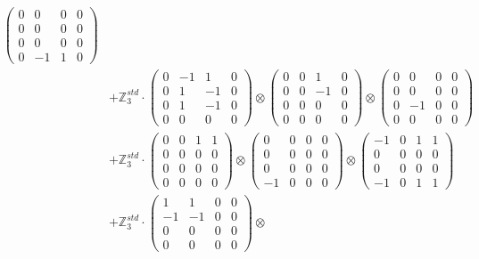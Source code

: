 \documentclass{article}
\begin{document}
{\begin{align}
            \begin{pmatrix} 0 & 0 & 0 & 0 \\ 0 & 0 & 0 & 0 \\ 0 & 0 & 0 & 0 \\ 0 & -1 & 1 & 0 \end{pmatrix} \\ 
        &+ \label{Rs16-Rc11-Solution-18-c25} \mathbb{Z}_3^{std} \cdot 
            \begin{pmatrix} 0 & -1 & 1 & 0 \\ 0 & 1 & -1 & 0 \\ 0 & 1 & -1 & 0 \\ 0 & 0 & 0 & 0 \end{pmatrix} \otimes 
            \begin{pmatrix} 0 & 0 & 1 & 0 \\ 0 & 0 & -1 & 0 \\ 0 & 0 & 0 & 0 \\ 0 & 0 & 0 & 0 \end{pmatrix} \otimes 
            \begin{pmatrix} 0 & 0 & 0 & 0 \\ 0 & 0 & 0 & 0 \\ 0 & -1 & 0 & 0 \\ 0 & 0 & 0 & 0 \end{pmatrix} \\ 
        &+ \label{Rs16-Rc11-Solution-18-c26} \mathbb{Z}_3^{std} \cdot 
            \begin{pmatrix} 0 & 0 & 1 & 1 \\ 0 & 0 & 0 & 0 \\ 0 & 0 & 0 & 0 \\ 0 & 0 & 0 & 0 \end{pmatrix} \otimes 
            \begin{pmatrix} 0 & 0 & 0 & 0 \\ 0 & 0 & 0 & 0 \\ 0 & 0 & 0 & 0 \\ -1 & 0 & 0 & 0 \end{pmatrix} \otimes 
            \begin{pmatrix} -1 & 0 & 1 & 1 \\ 0 & 0 & 0 & 0 \\ 0 & 0 & 0 & 0 \\ -1 & 0 & 1 & 1 \end{pmatrix} \\ 
        &+ \label{Rs16-Rc11-Solution-18-c27} \mathbb{Z}_3^{std} \cdot 
            \begin{pmatrix} 1 & 1 & 0 & 0 \\ -1 & -1 & 0 & 0 \\ 0 & 0 & 0 & 0 \\ 0 & 0 & 0 & 0 \end{pmatrix} \otimes 

\end{align}}
\end{document}
